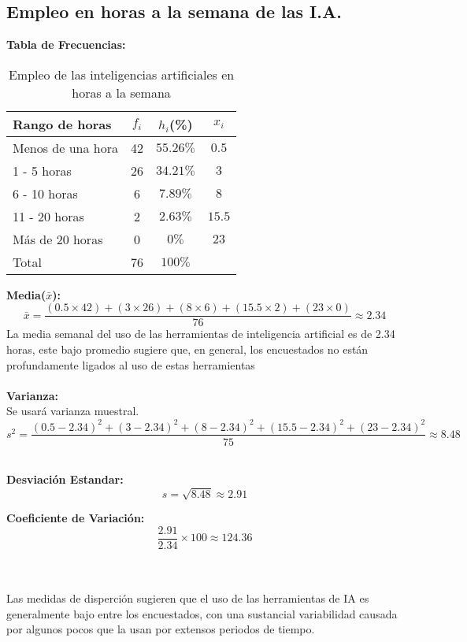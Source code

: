 \subsection{Empleo en horas a la semana de las I.A.}
\noindent \textbf{Tabla de Frecuencias:} \\

\begin{table}[h!]
	\centering
	\renewcommand{\arraystretch}{1.5} 
	\begin{tabular}{l c c c }
		\hline
		{Rango de horas} & {\(f_i\)} & \textit{\(h_i\)}(\%) & \textit{\(x_i\)}\\
		\hline
		Menos de una hora	& 42 & \(55.26\%\) & \(0.5\)	\\
		1 - 5 horas			& 26 & \(34.21\%\) & \(3\)		\\
		6 - 10 horas 		& 6  & \(7.89\%\)  & \(8\)		\\
		11 - 20 horas 		& 2  & \(2.63\%\)  & \(15.5\)	\\
		Más de 20 horas		& 0  & \(0\%\)     & \(23\)		\\
		\hline
		Total				& 76 & \(100\%\) \\
		\hline
	\end{tabular}
	\caption{Empleo de las inteligencias artificiales en horas a la semana}
	\label{tabla:EmpleoEnHoras}
\end{table}

\noindent \textbf{Media(\(\bar{x}\)):}
\begin{equation*}
	\bar{x} = \frac{(0.5 \times 42) + (3 \times 26) + (8 \times 6) + (15.5 \times 2) + (23 \times 0)}{76} \approx 2.34
\end{equation*}
La media semanal del uso de las herramientas de inteligencia artificial es de 2.34 horas, este bajo promedio sugiere que, en general, los encuestados no están profundamente ligados al uso de estas herramientas \\ \\

\noindent\textbf{Varianza:} \\
Se usará varianza muestral.
\begin{equation*}
	s^2 = \frac{(0.5 - 2.34)^2 + (3 - 2.34)^2 + (8 - 2.34)^2 + (15.5 - 2.34)^2 + (23 - 2.34)^2}{75} \approx 8.48
\end{equation*} \\

\begin{minipage}[t]{0.5\textwidth}
	\noindent\textbf{Desviación Estandar:}
	\begin{equation*}
		s = \sqrt{8.48} \approx 2.91
	\end{equation*}
	
\end{minipage}%
\hfill
\begin{minipage}[t]{0.5\textwidth}
	\noindent\textbf{Coeficiente de Variación:}
	\begin{equation*}
		\frac{2.91}{2.34} \times 100 \approx 124.36
	\end{equation*}  
\end{minipage} \\ \\

\noindent Las medidas de disperción sugieren que el uso de las herramientas de IA es generalmente bajo entre los encuestados, con una sustancial variabilidad causada por algunos pocos que la usan por extensos periodos de tiempo.